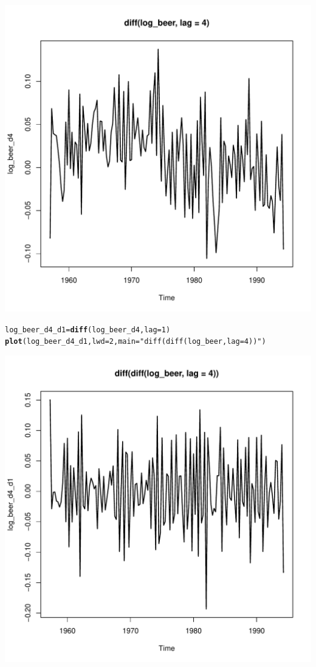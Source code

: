 \documentclass[10pt]{article}\usepackage[]{graphicx}\usepackage[]{color}
\makeatletter
\def\maxwidth{ %
  \ifdim\Gin@nat@width>\linewidth
    \linewidth
  \else
    \Gin@nat@width
  \fi
}
\newcommand{\hlnum}[1]{\textcolor[rgb]{0.686,0.059,0.569}{#1}}%
\newcommand{\hlstr}[1]{\textcolor[rgb]{0.192,0.494,0.8}{#1}}%
\newcommand{\hlstd}[1]{\textcolor[rgb]{0.345,0.345,0.345}{#1}}%
\newcommand{\hlkwb}[1]{\textcolor[rgb]{0.69,0.353,0.396}{#1}}%
\newcommand{\hlkwc}[1]{\textcolor[rgb]{0.333,0.667,0.333}{#1}}%
\newcommand{\hlkwd}[1]{\textcolor[rgb]{0.737,0.353,0.396}{\textbf{#1}}}%
\newenvironment{kframe}{%
 \def\at@end@of@kframe{}%
 \ifinner\ifhmode%
  \def\at@end@of@kframe{\end{minipage}}%
  \begin{minipage}{\columnwidth}%
 \fi\fi%
 \def\FrameCommand##1{\hskip\@totalleftmargin \hskip-\fboxsep
 \colorbox{shadecolor}{##1}\hskip-\fboxsep
     \hskip-\linewidth \hskip-\@totalleftmargin \hskip\columnwidth}%
 \MakeFramed {\advance\hsize-\width
   \@totalleftmargin\z@ \linewidth\hsize
   \@setminipage}}%
 {\par\unskip\endMakeFramed%
 \at@end@of@kframe}
\newenvironment{knitrout}{}{} %
\makeatother
\begin{document}
\begin{knitrout}
\includegraphics[width=\maxwidth]{figure/unnamed-chunk-17-2} 
\begin{kframe}\begin{alltt}
\hlstd{log_beer_d4_d1} \hlkwb{=} \hlkwd{diff}\hlstd{(log_beer_d4,} \hlkwc{lag} \hlstd{=} \hlnum{1}\hlstd{)}
\hlkwd{plot}\hlstd{(log_beer_d4_d1,}\hlkwc{lwd} \hlstd{=} \hlnum{2}\hlstd{,} \hlkwc{main} \hlstd{=} \hlstr{"diff(diff(log_beer, lag = 4))"}\hlstd{)}
\end{alltt}
\end{kframe}
\includegraphics[width=\maxwidth]{figure/unnamed-chunk-17-3} 

\end{knitrout}
\end{document}
